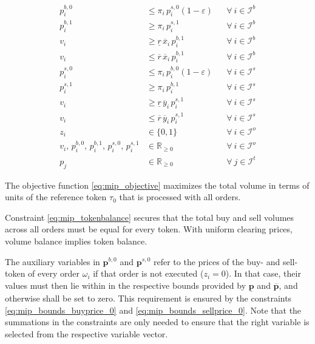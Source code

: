 \documentclass[11pt,parskip=full]{scrartcl}%
\newcommand*{\itokens}{\mathcal{I}^t}       %
\newcommand*{\iorders}{\mathcal{I}^o}       %
\newcommand*{\ibuyorders}{\mathcal{I}^b}    %
\newcommand*{\isellorders}{\mathcal{I}^s}   %
\begin{document}
\begin{subequations}
\begin{align}
  \\[4mm]
  p^{b,0}_i
  &\le \pi_i \, p^{s,0}_i (1-\varepsilon)
  && \forall \> i \in \ibuyorders
  \label{eq:mip_buyorder_disj_0}
  \\[1mm]
  p^{b,1}_i
  &\ge \pi_i \, p^{s,1}_i
  && \forall \> i \in \ibuyorders
  \label{eq:mip_buyorder_disj_1}
  \\[1mm]
  v_i
  &\ge \underline{r} \, \overline{x}_i \, p^{b,1}_i
  && \forall \> i \in \ibuyorders
  \label{eq:mip_buyorder_volume_lb}
  \\[1mm]
  v_i
  &\le \overline{r} \, \overline{x}_i \, p^{b,1}_i
  && \forall \> i \in \ibuyorders
  \label{eq:mip_buyorder_volume_ub}
  \\[4mm]
  p^{s,0}_i
  &\le \pi_i \, p^{b,0}_i (1-\varepsilon)
  && \forall \> i \in \isellorders
  \label{eq:mip_sellorder_disj_0}
  \\[1mm]
  p^{s,1}_i
  &\ge \pi_i \, p^{b,1}_i
  && \forall \> i \in \isellorders
  \label{eq:mip_sellorder_disj_1}
  \\[1mm]
  v_i
  &\ge \underline{r} \, \overline{y}_i \, p^{s,1}_i
  && \forall \> i \in \isellorders
  \label{eq:mip_sellorder_volume_lb}
  \\[1mm]
  v_i
  &\le \overline{r} \, \overline{y}_i \, p^{s,1}_i
  && \forall \> i \in \isellorders
  \label{eq:mip_sellorder_volume_ub}
  \\[4mm]
  z_i
  &\in \{0,1\}
  && \forall \> i \in \iorders
  \\[1mm]
  v_i, \, p^{b,0}_i, \, p^{b,1}_i, \, p^{s,0}_i, \, p^{s,1}_i
  &\in \mathbb{R}_{\ge 0}
  && \forall \> i \in \iorders
  \\[1mm]
  p_j
  &\in \mathbb{R}_{\ge 0}
  && \forall \> j \in \itokens
\end{align}
\label{eq:mip1}
\end{subequations}

The objective function \eqref{eq:mip_objective} maximizes the total volume in terms of units of
the reference token $ \tau_0 $ that is processed with all orders.

Constraint \eqref{eq:mip_tokenbalance} secures that the total buy and sell volumes across all 
orders must be equal for every token.
With uniform clearing prices, volume balance implies token balance.

The auxiliary variables in $ \mathbf{p}^{b,0} $ and $ \mathbf{p}^{s,0} $ refer to the prices of the
buy- and sell-token of every order $ \omega_i $ if that order is not executed ($ z_i = 0 $).
In that case, their values must then lie within in the respective bounds provided by $ \underline{
\mathbf{p}} $ and $ \overline{\mathbf{p}} $, and otherwise shall be set to zero.
This requirement is ensured by the constraints \eqref{eq:mip_bounds_buyprice_0} and
\eqref{eq:mip_bounds_sellprice_0}.
Note that the summations in the constraints are only needed to ensure that the right variable is
selected from the respective variable vector.
\end{document}

